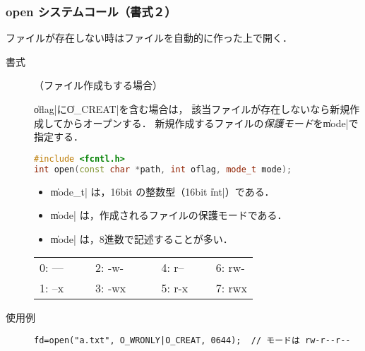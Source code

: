 \documentclass{beamer}                 %
\begin{document}
\begin{frame}[fragile]
  \frametitle{open システムコール（書式２）}
  ファイルが存在しない時はファイルを自動的に作った上で開く．

\begin{description}
\item[書式]（ファイル作成もする場合）

\|oflag|に\|O_CREAT|を含む場合は，
該当ファイルが存在しないなら新規作成してからオープンする．
新規作成するファイルの\emph{保護モード}を\|mode|で指定する．

\begin{lstlisting}[language=C++]
#include <fcntl.h>
int open(const char *path, int oflag, mode_t mode);
\end{lstlisting}

\begin{itemize}
\item \|mode_t| は，16bit の整数型（16bit \|int|）である．
\item \|mode| は，作成されるファイルの保護モードである．
\item \|mode| は，8進数で記述することが多い．
\end{itemize}

{\footnotesize\ttfamily\begin{center}\begin{tabular}{l l l l}
0: --- ~~~ & 2: -w-  ~~~~ & 4: r-- ~~~ & 6: rw- \\
1: --x     & 3: -wx       & 5: r-x     & 7: rwx \\
\end{tabular}\end{center}}

\item[使用例]
\begin{lstlisting}[numbers=none]
fd=open("a.txt", O_WRONLY|O_CREAT, 0644);  // モードは rw-r--r-- 
\end{lstlisting}

\end{description}
\end{frame}
\end{document}
